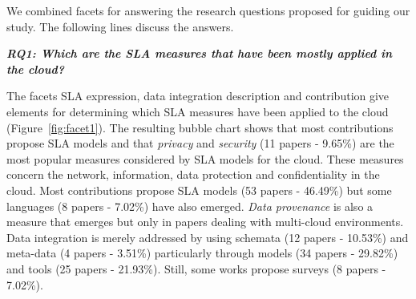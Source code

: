We combined facets for answering the research questions proposed for guiding our
study. The following lines discuss the answers.


 
\textbf{\textit{RQ1: Which are the SLA measures that have been mostly applied 
in the cloud?}}


The facets SLA expression, data integration description and contribution give elements for determining which SLA measures have been applied to the cloud (Figure~\ref{fig:facet1}). 
The resulting bubble chart shows that most contributions propose SLA models and that  \textit{privacy}
and \textit{security} (11 papers - 9.65\%) are the most popular measures considered by SLA models for the cloud. These measures concern the network, information, data protection and confidentiality in the cloud. Most contributions propose SLA models (53 papers - 46.49\%)  but some languages (8 papers - 7.02\%) have also emerged. {\em Data provenance} is also a measure that emerges but only in papers dealing with multi-cloud environments. Data integration is merely addressed by using schemata (12 papers - 10.53\%)  and meta-data (4 papers - 3.51\%) particularly through models (34 papers - 29.82\%) and tools (25 papers - 21.93\%). Still, some works propose surveys (8 papers - 7.02\%).
 
